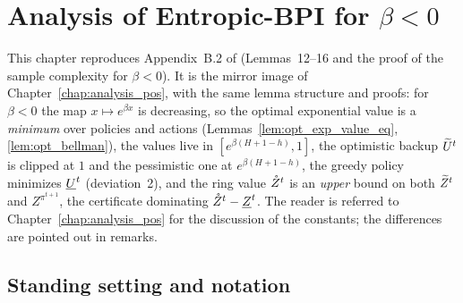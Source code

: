 \chapter{Analysis of Entropic-BPI for \texorpdfstring{$\beta < 0$}{beta < 0}}
\label{chap:analysis_neg}

This chapter reproduces Appendix~B.2 of \cite{essakine2026tight} (Lemmas~12--16 and the proof
of the sample complexity for $\beta < 0$). It is the mirror image of
Chapter~\ref{chap:analysis_pos}, with the same lemma structure and proofs: for $\beta < 0$ the map
$x \mapsto e^{\beta x}$ is decreasing, so the optimal exponential value is a \emph{minimum} over
policies and actions (Lemmas~\ref{lem:opt_exp_value_eq}, \ref{lem:opt_bellman}), the values live in
$[e^{\beta(H+1-h)}, 1]$, the optimistic backup $\widetilde{U}^t$ is clipped at $1$ and the pessimistic one at
$e^{\beta(H+1-h)}$, the greedy policy minimizes $\underline{U}^t$ (deviation~2), and the ring value $\mathring{Z}^t$ is an
\emph{upper} bound on both $\widetilde{Z}^t$ and $Z^{\pi^{t+1}}$, the certificate dominating $\mathring{Z}^t - \underline{Z}^t$.
The reader is referred to Chapter~\ref{chap:analysis_pos} for the discussion of the constants;
the differences are pointed out in remarks.

\section{Standing setting and notation}
\label{sec:neg_setting}


